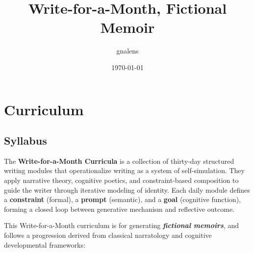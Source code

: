 \documentclass[11pt]{article}
\author{gnalens}
\date{\today}
\title{Write-for-a-Month, Fictional Memoir}
\begin{document}
\maketitle
\setcounter{tocdepth}{1}
\tableofcontents
\section*{Curriculum}
\label{sec:orgd62ba7a}

\startcontents[level-1]
\subsection*{Syllabus}
\label{sec:org3259c29}

The \textbf{Write-for-a-Month Curricula} is a collection of thirty-day structured writing modules that operationalize writing as a system of self-simulation. They apply narrative theory, cognitive poetics, and constraint-based composition to guide the writer through iterative modeling of identity. Each daily module defines a \textbf{constraint} (formal), a \textbf{prompt} (semantic), and a \textbf{goal} (cognitive function), forming a closed loop between generative mechanism and reflective outcome.

This Write-for-a-Month curriculum is for generating \textbf{\emph{fictional memoirs}}, and follows a progression derived from classical narratology and cognitive developmental frameworks:
\end{document}
